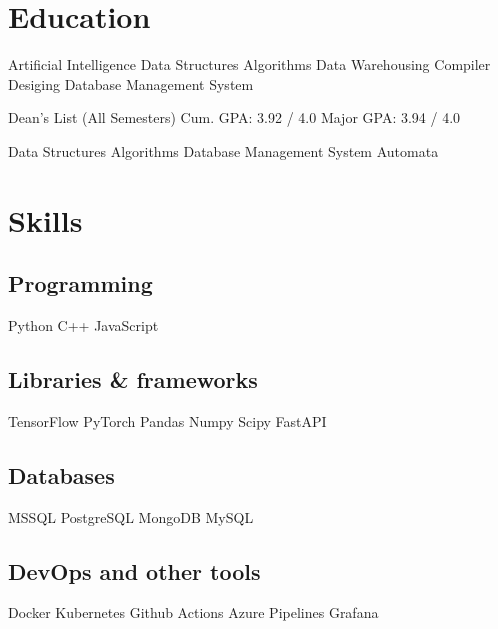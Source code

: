 \documentclass[]{deedy-resume-openfont}
\begin{document}
\sectionsep

\section{Education}

Artificial Intelligence \textbullet{} Data Structures \textbullet{} Algorithms \textbullet{} Data Warehousing \textbullet{} Compiler Desiging \textbullet{} Database Management System
\sectionsep

Dean's List (All Semesters) \textbullet{}
Cum. GPA: 3.92 / 4.0 \textbullet{}
Major GPA: 3.94 / 4.0


Data Structures \textbullet{} Algorithms \textbullet{} Database Management System \textbullet{} Automata

\sectionsep

\section{Skills}
\begin{minipage}[t]{.6\textwidth}
\subsection{Programming}
Python \textbullet{}   C++ \textbullet{} JavaScript
\subsection{Libraries \& frameworks}
TensorFlow \textbullet{} PyTorch \textbullet{} Pandas \textbullet{} Numpy \textbullet{} Scipy \textbullet{} FastAPI
\subsection{Databases}
MSSQL \textbullet{} PostgreSQL \textbullet{} MongoDB \textbullet{} MySQL
\subsection{DevOps and other tools}
Docker \textbullet{} Kubernetes \textbullet{} Github Actions \textbullet{} Azure Pipelines \textbullet{} Grafana
\sectionsep
\end{minipage}
\end{document}
